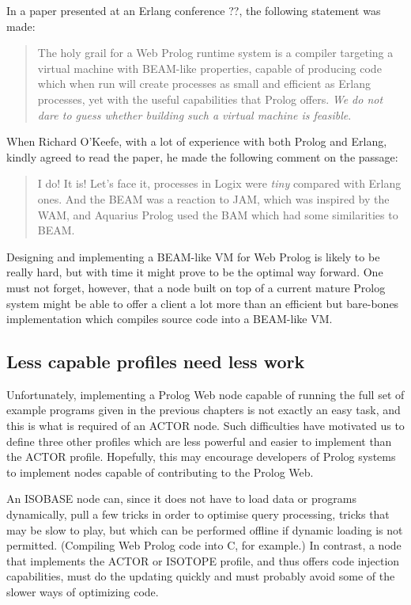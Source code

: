 In a paper presented at an Erlang conference ??, the following statement was made: 

\begin{quotation}
The holy grail for a Web Prolog runtime system is a compiler targeting a virtual machine with BEAM-like properties, capable of producing code which when run will create processes as small and efficient as Erlang processes, yet with the useful capabilities that Prolog offers. \textit{We do not dare to guess whether building such a virtual machine is feasible}.
\end{quotation}

\noindent When Richard O'Keefe, with a lot of experience with both Prolog and Erlang, kindly agreed to read the paper, he made the following comment on the passage:

\begin{quotation}
I do! It is! Let's face it, processes in Logix were \textit{tiny} compared with Erlang ones. And the BEAM was a reaction to JAM, which was inspired by the WAM, and Aquarius Prolog used the BAM which had some similarities to BEAM.
\end{quotation}

\noindent Designing and implementing a BEAM-like VM for Web Prolog is likely to be really hard, but with time it might prove to be the optimal way forward. One must not forget, however, that a node built on top of a current mature Prolog system might be able to offer a client a lot more than an efficient but bare-bones implementation which compiles source code into a BEAM-like VM.



\subsection{Less capable profiles need less work}\label{sec:relation-node-implementation-less}

Unfortunately, implementing a Prolog Web node capable of running the full set of example programs given in the previous chapters is not exactly an easy task, and this is what is required of an ACTOR node. Such difficulties have motivated us to define three other profiles which are less powerful and easier to implement than the ACTOR profile. Hopefully, this may encourage developers of Prolog systems to implement nodes capable of contributing to the Prolog Web. 

An ISOBASE node can, since it does not have to load data or programs dynamically, pull a few tricks in order to optimise query processing, tricks that may be slow to play, but which can be performed offline if dynamic loading is not permitted. (Compiling Web Prolog code into C, for example.) In contrast, a node that implements the ACTOR or ISOTOPE profile, and thus offers code injection capabilities, must do the updating quickly and must probably avoid some of the slower ways of optimizing code.

